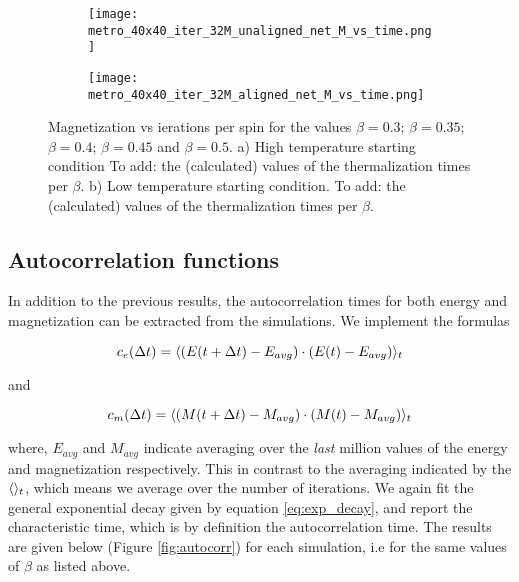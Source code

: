 \documentclass[11pt,a4paper]{article}
\DeclarePairedDelimiter{\avg}{\langle}{\rangle}
\begin{document}
\begin{figure}[h!]
\centering
\begin{subfigure}{.5\textwidth}
  \centering
  \texttt{[image: metro\_40x40\_iter\_32M\_unaligned\_net\_M\_vs\_time.png]}
  \caption{}
  \label{fig:Mvt_highT}
\end{subfigure}%
\begin{subfigure}{.5\textwidth}
  \centering
  \texttt{[image: metro\_40x40\_iter\_32M\_aligned\_net\_M\_vs\_time.png]}
  \caption{}
  \label{fig:Mvt_lowT}
\end{subfigure}
\caption{Magnetization vs ierations per spin for the values $\beta = 0.3$; $\beta = 0.35$;
         $\beta = 0.4$; $\beta = 0.45$ and $\beta = 0.5$. a) High temperature starting condition
         {\color{red}To add: the (calculated) values of the thermalization times per $\beta$}.
         b) Low temperature starting condition.
         {\color{red}To add: the (calculated) values of the thermalization times per $\beta$}.}
\label{fig:Mvt}
\end{figure}


\subsection{Autocorrelation functions}
In addition to the previous results, the autocorrelation times for both energy and magnetization can be
 extracted from the simulations. We implement the formulas

\begin{equation*}
    c_e(\Delta t) = \avg{(E(t+\Delta t) - E_{avg})\cdot (E(t)-E_{avg})}_t
\end{equation*}

and

\begin{equation*}
    c_m(\Delta t) = \avg{(M(t+\Delta t) - M_{avg})\cdot (M(t)-M_{avg})}_t
\end{equation*}


where, $E_{avg}$ and $M_{avg}$ indicate averaging over the \textit{last} million values of the energy and magnetization
 respectively. This in contrast to the averaging indicated by the $\avg{}_t$, which means we average over the number of
 iterations. We again fit the general exponential decay given by equation \ref{eq:exp_decay}, and report the characteristic
 time, which is by definition the autocorrelation time. The results are given below (Figure \ref{fig:autocorr})
 for each simulation, i.e for the same values of $\beta$ as listed above.
 
\end{document}

